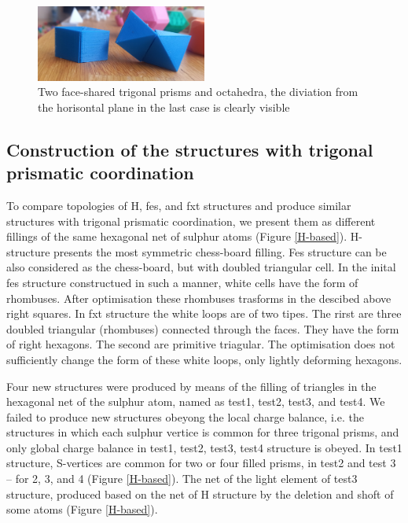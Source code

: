 \documentclass[a4paperm]{article}
\begin{document}
\begin{figure}[H] \centering
	\includegraphics[width=0.5\textwidth]{2prism_oct.jpg}
	\caption{Two face-shared trigonal prisms and octahedra, the diviation from the horisontal plane in the last case is clearly visible}
\label{2prism_oct.jpg}
\end{figure}



\subsection{Construction of the structures with trigonal prismatic coordination}

To compare topologies of H, fes, and fxt structures and produce similar structures with trigonal prismatic coordination, we present them as different fillings of the same hexagonal net of sulphur atoms (Figure \ref{H-based}).
H-structure presents the most symmetric chess-board filling.
Fes structure can be also considered as the chess-board, but with doubled triangular cell.
In the inital fes structure constructued in such a manner, white cells have the form of rhombuses.
After optimisation these rhombuses trasforms in the descibed above right squares.
In fxt structure the white loops are of two tipes.
The rirst are three doubled triangular (rhombuses) connected through the faces.
They have the form of right hexagons.
The second are primitive triagular.
The optimisation does not sufficiently change the form of these white loops, only lightly deforming hexagons.


Four new structures were produced by means of the filling of triangles in the hexagonal net of the sulphur atom, named as test1, test2, test3, and test4.
We failed to produce new structures obeyong the local charge balance, i.e. the structures in which each sulphur vertice is common for three trigonal prisms, and only global charge balance in test1, test2, test3, test4 structure is obeyed.
In test1 structure, S-vertices are common for two or four filled prisms, in test2 and test 3 – for 2, 3, and 4 (Figure \ref{H-based}).
The net of the light element of test3 structure, produced based on the net of H structure by the deletion and shoft of some atoms (Figure \ref{H-based}).
\end{document}
